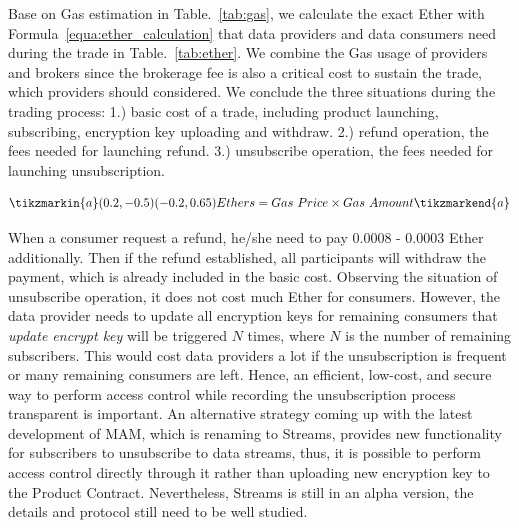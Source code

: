 \begin{spacing}{2.0}
Base on Gas estimation in Table.~\ref{tab:gas}, we calculate the exact Ether with Formula~\ref{equa:ether_calculation} that data providers and data consumers need during the trade in Table.~\ref{tab:ether}. We combine the Gas usage of providers and brokers since the brokerage fee is also a critical cost to sustain the trade, which providers should considered. We conclude the three situations during the trading process: 1.) basic cost of a trade, including product launching, subscribing, encryption key uploading and withdraw. 2.) refund operation, the fees needed for launching refund. 3.) unsubscribe operation, the fees needed for launching unsubscription.

\begin{equation}\tikzmarkin{a}(0.2,-0.5)(-0.2,0.65)
\label{equa:ether_calculation}
Ethers = Gas \ Price \times Gas \ Amount
\tikzmarkend{a}
\end{equation}

When a consumer request a refund, he/she need to pay 0.0008 - 0.0003 Ether additionally. Then if the refund established, all participants will withdraw the payment, which is already included in the basic cost. Observing the situation of unsubscribe operation, it does not cost much Ether for consumers. However, the data provider needs to update all encryption keys for remaining consumers that \textit{update encrypt key} will be triggered $N$ times, where $N$ is the number of remaining subscribers. This would cost data providers a lot if the unsubscription is frequent or many remaining consumers are left. Hence, an efficient, low-cost, and secure way to perform access control while recording the unsubscription process transparent is important. An alternative strategy coming up with the latest development of MAM, which is renaming to Streams\cite{stream}, provides new functionality for subscribers to unsubscribe to data streams, thus, it is possible to perform access control directly through it rather than uploading new encryption key to the Product Contract. Nevertheless, Streams is still in an alpha version, the details and protocol still need to be well studied.


\end{spacing}
